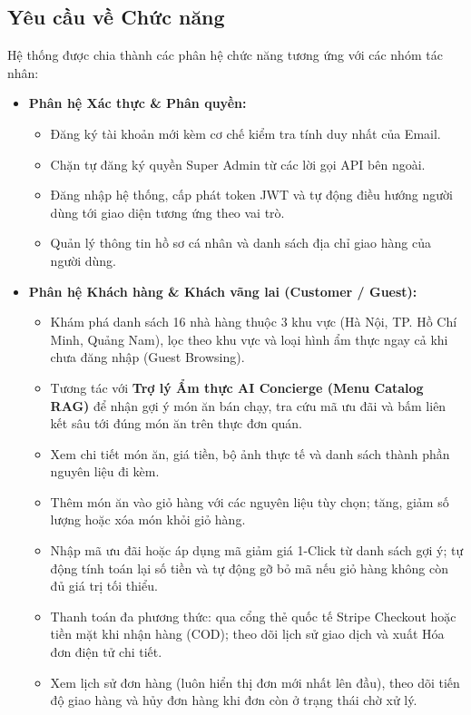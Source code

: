 \documentclass{uetgraduation}
\begin{document}
\subsection{Yêu cầu về Chức năng}
Hệ thống được chia thành các phân hệ chức năng tương ứng với các nhóm tác nhân:
\begin{itemize}
    \item \textbf{Phân hệ Xác thực \& Phân quyền:}
    \begin{itemize}
        \item Đăng ký tài khoản mới kèm cơ chế kiểm tra tính duy nhất của Email.
        \item Chặn tự đăng ký quyền Super Admin từ các lời gọi API bên ngoài.
        \item Đăng nhập hệ thống, cấp phát token JWT và tự động điều hướng người dùng tới giao diện tương ứng theo vai trò.
        \item Quản lý thông tin hồ sơ cá nhân và danh sách địa chỉ giao hàng của người dùng.
    \end{itemize}
    \item \textbf{Phân hệ Khách hàng \& Khách vãng lai (Customer / Guest):}
    \begin{itemize}
        \item Khám phá danh sách 16 nhà hàng thuộc 3 khu vực (Hà Nội, TP. Hồ Chí Minh, Quảng Nam), lọc theo khu vực và loại hình ẩm thực ngay cả khi chưa đăng nhập (Guest Browsing).
        \item Tương tác với \textbf{Trợ lý Ẩm thực AI Concierge (Menu Catalog RAG)} để nhận gợi ý món ăn bán chạy, tra cứu mã ưu đãi và bấm liên kết sâu tới đúng món ăn trên thực đơn quán.
        \item Xem chi tiết món ăn, giá tiền, bộ ảnh thực tế và danh sách thành phần nguyên liệu đi kèm.
        \item Thêm món ăn vào giỏ hàng với các nguyên liệu tùy chọn; tăng, giảm số lượng hoặc xóa món khỏi giỏ hàng.
        \item Nhập mã ưu đãi hoặc áp dụng mã giảm giá 1-Click từ danh sách gợi ý; tự động tính toán lại số tiền và tự động gỡ bỏ mã nếu giỏ hàng không còn đủ giá trị tối thiểu.
        \item Thanh toán đa phương thức: qua cổng thẻ quốc tế Stripe Checkout hoặc tiền mặt khi nhận hàng (COD); theo dõi lịch sử giao dịch và xuất Hóa đơn điện tử chi tiết.
        \item Xem lịch sử đơn hàng (luôn hiển thị đơn mới nhất lên đầu), theo dõi tiến độ giao hàng và hủy đơn hàng khi đơn còn ở trạng thái chờ xử lý.

\end{itemize}
\end{itemize}
\end{document}
